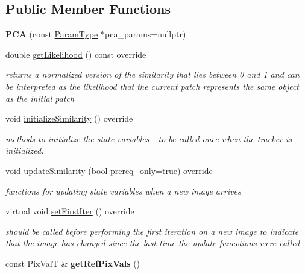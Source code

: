 \subsection*{Public Member Functions}
\begin{DoxyCompactItemize}
\item 
\hypertarget{classPCA_a374eed4739cd6adbaf1b74cf2c2fbb8e}{{\bfseries P\-C\-A} (const \hyperlink{structPCAParams}{Param\-Type} $\ast$pca\-\_\-params=nullptr)}\label{classPCA_a374eed4739cd6adbaf1b74cf2c2fbb8e}

\item 
\hypertarget{classPCA_ad77e1c89f51d7478fd5edecbc825a1a7}{double \hyperlink{classPCA_ad77e1c89f51d7478fd5edecbc825a1a7}{get\-Likelihood} () const override}\label{classPCA_ad77e1c89f51d7478fd5edecbc825a1a7}

\begin{DoxyCompactList}\small\item\em returns a normalized version of the similarity that lies between 0 and 1 and can be interpreted as the likelihood that the current patch represents the same object as the initial patch \end{DoxyCompactList}\item 
void \hyperlink{classPCA_a61db2e8d680ff747c9d6fc1c928dd9ee}{initialize\-Similarity} () override
\begin{DoxyCompactList}\small\item\em methods to initialize the state variables -\/ to be called once when the tracker is initialized. \end{DoxyCompactList}\item 
void \hyperlink{classPCA_a44e03ba4301d9a8b4ba1dadf85b05358}{update\-Similarity} (bool prereq\-\_\-only=true) override
\begin{DoxyCompactList}\small\item\em functions for updating state variables when a new image arrives \end{DoxyCompactList}\item 
\hypertarget{classPCA_a0172ae4b030c3327cecbd6c1a6a17d84}{virtual void \hyperlink{classPCA_a0172ae4b030c3327cecbd6c1a6a17d84}{set\-First\-Iter} () override}\label{classPCA_a0172ae4b030c3327cecbd6c1a6a17d84}

\begin{DoxyCompactList}\small\item\em should be called before performing the first iteration on a new image to indicate that the image has changed since the last time the update funcvtions were called \end{DoxyCompactList}\item 
\hypertarget{classPCA_ae57c754afdcbb05d47947e298d5a28e2}{const Pix\-Val\-T \& {\bfseries get\-Ref\-Pix\-Vals} ()}\label{classPCA_ae57c754afdcbb05d47947e298d5a28e2}

\end{DoxyCompactItemize}
